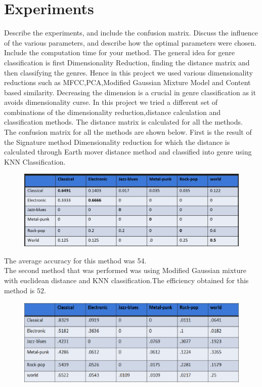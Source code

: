 \documentclass[12pt]{article}
\begin{document}
\section{Experiments}
Describe the experiments, and include the confusion matrix. Discuss
the influence of the various parameters, and describe how the optimal
parameters were chosen. Include the computation time for your method.
The general idea for genre classification is first Dimensionality Reduction, finding the distance matrix and then classifying the genres.
Hence in this project we used various dimensionality reductions such as MFCC,PCA,Modified Gaussian Mixture Model and Content based similarity. Decreasing the dimension is a crucial in genre classification as it avoids dimensionality curse.
In this project we tried a different set of combinations of the dimensionality reduction,distance calculation and classification methods.
The distance matrix is calculated for all the methods.\\ 
The confusion matrix for all the methods are shown below. First is the result of the Signature method Dimensionality reduction for which the distance is calculated through Earth mover distance method and classified into genre using KNN Classification.
 \begin{figure}[H]
\includegraphics [scale=0.35]{results1.png}
\end{figure}
The average accuracy for this method was 54. \\
The second method that was performed was using Modified Gaussian mixture with euclidean distance and KNN classification.The efficiency obtained for this method is $52$.
\begin{figure}[H]
\includegraphics [scale=0.65]{result2.png}
\end{figure}
\end{document}
